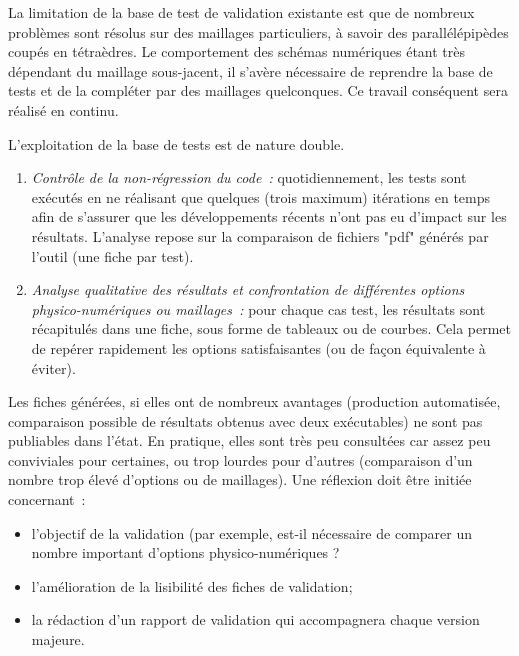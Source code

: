 La limitation de la base de test de validation existante est que de nombreux probl\`emes sont r\'esolus sur des maillages particuliers, \`a savoir des parall\'el\'epip\`edes coup\'es en t\'etra\`edres. Le comportement des sch\'emas num\'eriques \'etant tr\`es d\'ependant du maillage sous-jacent, il s'av\`ere n\'ecessaire de reprendre la base de tests et de la compl\'eter par des maillages quelconques. Ce travail cons\'equent sera r\'ealis\'e en continu.

L'exploitation de la base de tests est de nature double.
\begin{enumerate}
\item
{\it{Contrôle de la non-r\'egression du code~:}} quotidiennement, les tests sont ex\'ecut\'es en ne r\'ealisant que quelques (trois maximum) it\'erations en temps afin de s'assurer que les d\'eveloppements r\'ecents n'ont pas eu d'impact sur les r\'esultats. L'analyse repose sur la comparaison de fichiers "pdf" g\'en\'er\'es par l'outil (une fiche par test).
\item
{\it{ Analyse qualitative des r\'esultats et confrontation de diff\'erentes options physico-num\'eriques ou maillages~:}} pour chaque cas test, les r\'esultats sont
r\'ecapitul\'es dans une fiche, sous forme de tableaux ou de courbes. Cela permet de rep\'erer rapidement les options satisfaisantes (ou de fa\c con \'equivalente \`a \'eviter).
\end{enumerate}

Les fiches g\'en\'er\'ees, si elles ont de nombreux avantages (production automatis\'ee, comparaison possible de r\'esultats obtenus avec deux ex\'ecutables) ne sont pas publiables dans l'\'etat. En pratique, elles sont tr\`es peu consult\'ees car assez peu conviviales pour certaines, ou trop lourdes pour d'autres (comparaison d'un nombre trop \'elev\'e d'options ou de maillages). Une r\'eflexion doit \^etre initi\'ee concernant~:

\begin{itemize}
\item
 l'objectif de la validation (par exemple, est-il n\'ecessaire de comparer un nombre important d'options physico-num\'eriques ? 
\item
l'am\'elioration de la lisibilit\'e des fiches de validation;
\item
la r\'edaction d'un rapport de validation qui accompagnera chaque version majeure.
\end{itemize}

